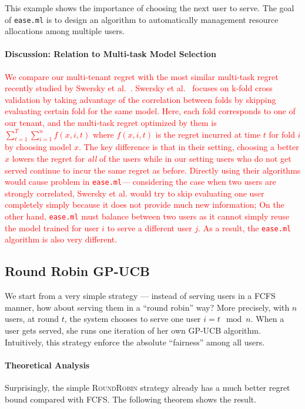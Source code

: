 \documentclass[letterpaper]{vldb}
\newcommand{\eml}{\texttt{ease.ml}\xspace}
\newcommand{\rr}{\textsc{RoundRobin}\xspace}
\begin{document}
\vspace{0.5em}
This example shows the importance of
choosing the next user to serve. The goal of
\eml is to design an algorithm
to automatically management resource
allocations among multiple users.

\vspace{-0.5em}
\paragraph*{Discussion: Relation to 
Multi-task Model Selection}
\textcolor{red}{We compare our multi-tenant
regret with the most similar multi-task
regret recently
studied by Swersky et al.~\cite{XXX}.
Swersky et al.~\cite{XXX} focuses on 
k-fold cross validation by 
taking advantage of the correlation between
folds by skipping evaluating certain fold for the same model. Here, each fold corresponds to 
one of our tenant, and the
multi-task regret optimized by them
is $\sum_{t=1}^T \sum_{i=1}^n f(x, i, t)$
where $f(x, i, t)$ is the regret incurred
at time $t$ for fold $i$ by choosing
model $x$. The key difference
is that in their setting, choosing a
better $x$ lowers the regret for {\em all}
of the users while in our setting users
who do not get served continue to incur 
the same regret as before. 
Directly using their algorithms would 
cause problem in \eml --- considering
the case when two users are strongly correlated, Swersky et al. would try to 
skip evaluating one user completely
simply because it does not provide much new information; On the other hand, \eml must 
balance between two users as it cannot 
simply reuse the model trained 
for user $i$ to serve a different user $j$.
As a result, the \eml algorithm is also very different.}

\subsection{Round Robin GP-UCB}

We start from a very simple strategy --- instead of
serving users in a FCFS manner, how about
serving them in a ``round robin'' way?
More precisely, with $n$ users, 
at round $t$, the system
chooses to serve one user $i = t \mod n$.
When a user gets served, she runs one
iteration of her own GP-UCB algorithm. 
Intuitively, this strategy enforce
the absolute ``fairness'' among all users.

\vspace{-0.5em}
\paragraph*{Theoretical Analysis}
Surprisingly, the simple \rr strategy already
has a much better regret bound compared
with FCFS. The following theorem shows
the result. 
\end{document}
